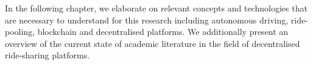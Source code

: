 In the following chapter, we elaborate on relevant concepts and technologies that are necessary to understand for this research including autonomous driving, ride-pooling, blockchain and decentralised platforms. We additionally present an overview of the current state of academic literature in the field of decentralised ride-sharing platforms. 